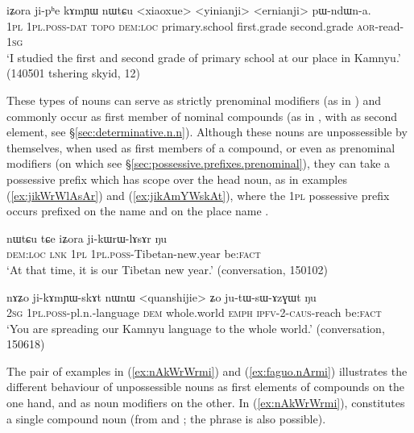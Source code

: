 \begin{exe}
\ex \label{ex:jiphe.kAmYW}
\gll   iʑora ji-pʰe kɤmɲɯ nɯtɕu <xiaoxue> <yinianji> <ernianji> pɯ-ndɯn-a. \\
\textsc{1pl} \textsc{1pl}.\textsc{poss}-\textsc{dat}  \textsc{topo} \textsc{dem}:\textsc{loc} primary.school first.grade second.grade \textsc{aor}-read-\textsc{1sg} \\
\glt `I studied the first and second grade of primary school at our place in Kamnyu.' (140501 tshering skyid, 12)
\end{exe}

These types of nouns can serve as strictly prenominal modifiers (as in ) and commonly occur as first member of nominal compounds (as in , with  as second element, see §\ref{sec:determinative.n.n}). Although these nouns are  unpossessible by themselves, when used as first members of a compound, or even as prenominal modifiers (on which see §\ref{sec:possessive.prefixes.prenominal}), they can take a possessive prefix which has scope over the head noun, as in examples (\ref{ex:jikWrWlAsAr}) and (\ref{ex:jikAmYWskAt}), where the \textsc{1pl} possessive prefix  occurs prefixed on the name  and on the place name  .

\begin{exe}
\ex \label{ex:jikWrWlAsAr}
 \gll nɯtɕu tɕe iʑora ji-kɯrɯ-lɤsɤr ŋu \\
 \textsc{dem}:\textsc{loc} \textsc{lnk} \textsc{1pl} \textsc{1pl}.\textsc{poss}-Tibetan-new.year be:\textsc{fact} \\
 \glt `At that time, it is our Tibetan new year.' (conversation, 150102)
\end{exe}

\begin{exe}
\ex \label{ex:jikAmYWskAt}
 \gll nɤʑo ji-kɤmɲɯ-skɤt nɯnɯ <quanshijie> ʑo ju-tɯ-sɯ-ɤzɣɯt ŋu \\
 \textsc{2sg} \textsc{1pl}.\textsc{poss}-pl.n.-language \textsc{dem} whole.world \textsc{emph} \textsc{ipfv}-2-\textsc{caus}-reach be:\textsc{fact} \\
  \glt `You are spreading our Kamnyu language to the whole world.' (conversation, 150618)
\end{exe}

The pair of examples in (\ref{ex:nAkWrWrmi}) and (\ref{ex:faguo.nArmi}) illustrates the different behaviour of unpossessible nouns as first elements of compounds on the one hand, and as noun modifiers on the other. In (\ref{ex:nAkWrWrmi}),   constitutes a single compound noun (from  and ; the phrase  is also possible).  

